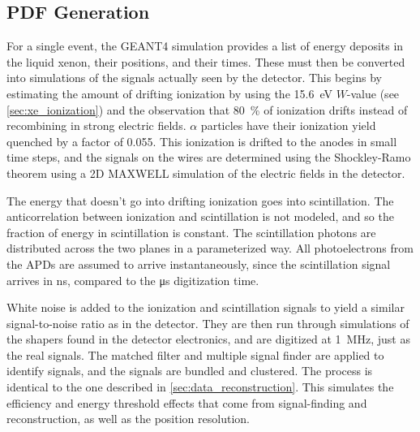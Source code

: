 \documentclass[herrin-thesis.tex]{subfiles}
\begin{document}


\subsection{PDF Generation}
For a single event, the GEANT4 simulation provides a list of energy deposits in the liquid xenon, their positions, and their times. These must then be converted into simulations of the signals actually seen by the detector. This begins by estimating the amount of drifting ionization by using the \SI{15.6}{\eV} \(W\)-value (see \cref{sec:xe_ionization}) and the observation that \about{}\SI{80}{\percent} of ionization drifts instead of recombining in strong electric fields\cite{Aprile:1991fk}. \(\alpha\) particles have their ionization yield quenched by a factor of 0.055\cite{Aprile:1991uq}. This ionization is drifted to the anodes in small time steps, and the signals on the wires are determined using the Shockley-Ramo theorem using a 2D MAXWELL simulation of the electric fields in the detector.

The energy that doesn't go into drifting ionization goes into scintillation. The anticorrelation between ionization and scintillation is not modeled, and so the fraction of energy in scintillation is constant. The scintillation photons are distributed across the two planes in a parameterized way. All photoelectrons from the APDs are assumed to arrive instantaneously, since the scintillation signal arrives in \si{\ns}, compared to the \si{\micro\s} digitization time.

White noise is added to the ionization and scintillation signals to yield a similar signal-to-noise ratio as in the detector. They are then run through simulations of the shapers found in the detector electronics, and are digitized at \SI{1}{\MHz}, just as the real signals. The matched filter and multiple signal finder are applied to identify signals, and the signals are bundled and clustered. The process is identical to the one described in \cref{sec:data_reconstruction}. This simulates the efficiency and energy threshold effects that come from signal-finding and reconstruction, as well as the position resolution.
\end{document}
